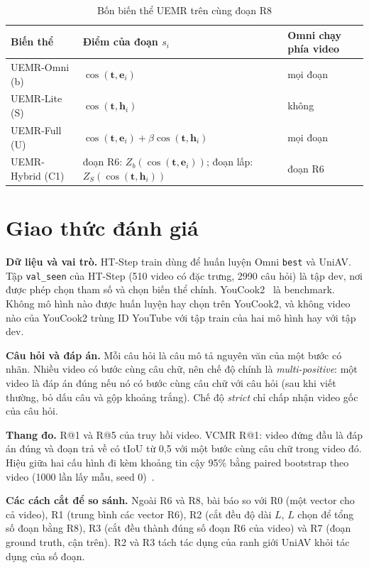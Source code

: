 \documentclass{IEEEtran}
\begin{document}
\begin{table}[t]
\caption{Bốn biến thể UEMR trên cùng đoạn R8}
\label{tab:variants}
\setlength{\tabcolsep}{3pt}
\centering
\begin{tabular}{|p{52pt}|p{112pt}|p{58pt}|}
\hline
Biến thể & Điểm của đoạn $s_i$ & Omni chạy phía video \\
\hline
UEMR-Omni (b) & $\cos(\mathbf{t}, \mathbf{e}_i)$ & mọi đoạn \\
UEMR-Lite (S) & $\cos(\mathbf{t}, \mathbf{h}_i)$ & không \\
UEMR-Full (U) & $\cos(\mathbf{t}, \mathbf{e}_i) + \beta \cos(\mathbf{t}, \mathbf{h}_i)$ & mọi đoạn \\
UEMR-Hybrid (C1) & đoạn R6: $Z_b(\cos(\mathbf{t}, \mathbf{e}_i))$; đoạn lấp: $Z_S(\cos(\mathbf{t}, \mathbf{h}_i))$ & đoạn R6 \\
\hline
\end{tabular}
\end{table}

\section{Giao thức đánh giá}
\label{sec:protocol}
\textbf{Dữ liệu và vai trò.} HT-Step train dùng để huấn luyện Omni \texttt{best} và UniAV. Tập \texttt{val\_seen} của HT-Step (510 video có đặc trưng, 2990 câu hỏi) là tập dev, nơi được phép chọn tham số và chọn biến thể chính. YouCook2~\cite{youcook2} là benchmark. Không mô hình nào được huấn luyện hay chọn trên YouCook2, và không video nào của YouCook2 trùng ID YouTube với tập train của hai mô hình hay với tập dev.

\textbf{Câu hỏi và đáp án.} Mỗi câu hỏi là câu mô tả nguyên văn của một bước có nhãn. Nhiều video có bước cùng câu chữ, nên chế độ chính là \emph{multi-positive}: một video là đáp án đúng nếu nó có bước cùng câu chữ với câu hỏi (sau khi viết thường, bỏ dấu câu và gộp khoảng trắng). Chế độ \emph{strict} chỉ chấp nhận video gốc của câu hỏi.

\textbf{Thang đo.} R@1 và R@5 của truy hồi video. VCMR R@1: video đứng đầu là đáp án đúng và đoạn trả về có tIoU từ 0,5 với một bước cùng câu chữ trong video đó. Hiệu giữa hai cấu hình đi kèm khoảng tin cậy 95\% bằng paired bootstrap theo video (1000 lần lấy mẫu, seed 0)~\cite{bootstrap}.

\textbf{Các cách cắt để so sánh.} Ngoài R6 và R8, bài báo so với R0 (một vector cho cả video), R1 (trung bình các vector R6), R2 (cắt đều độ dài $L$, $L$ chọn để tổng số đoạn bằng R8), R3 (cắt đều thành đúng số đoạn R6 của video) và R7 (đoạn ground truth, cận trên). R2 và R3 tách tác dụng của ranh giới UniAV khỏi tác dụng của số đoạn.
\end{document}
